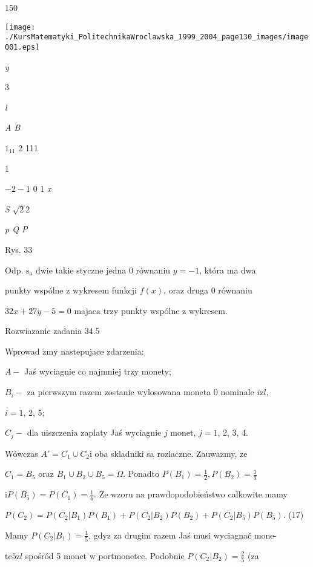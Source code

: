 \documentclass[a4paper,12pt]{article}
\begin{document}
150
\begin{center}
\texttt{[image: ./KursMatematyki\_PolitechnikaWroclawska\_1999\_2004\_page130\_images/image001.eps]}
\end{center}
{\it y}

3

{\it l}

{\it A  B}

$1_{11}$  2  111

1

$-2  -1$  0 1  {\it x}

{\it S}  $\sqrt{2}2$

{\it p  Q  P}

Rys. 33

Odp. $\mathrm{s}_{\mathrm{a}}$ dwie takie styczne jedna $0$ równaniu $y= -1$, która ma dwa

punkty wspólne $\mathrm{z}$ wykresem funkcji $f(x)$, oraz druga $0$ równaniu

$32x+27y-5=0$ majaca trzy punkty wspólne $\mathrm{z}$ wykresem.

Rozwiazanie zadania 34.5

Wprowad $\acute{\mathrm{z}}\mathrm{m}\mathrm{y}$ nastepujace zdarzenia:

$A-$ Jaś wyciagnie co najmniej trzy monety;

$B_{i}-$ za pierwszym razem zostanie wylosowana moneta $0$ nominale $i \mathrm{z}l,$

$i=1$, 2, 5;

$C_{j}-$ dla uiszczenia zaplaty Jaś wyciagnie $j$ monet, $j=1$, 2, 3, 4.

Wówczas $A' = C_{1}\cup C_{2} \mathrm{i}$ oba skladniki sa rozlaczne. Zauwazmy, $\dot{\mathrm{z}}\mathrm{e}$

$C_{1} = B_{5}$ oraz $B_{1}\cup B_{2}\cup B_{5} = \Omega$. Ponadto $P(B_{1}) = \displaystyle \frac{1}{2}, P(B_{2}) = \displaystyle \frac{1}{3}$

$\displaystyle \mathrm{i}P(B_{5})=P(C_{1})=\frac{1}{6}$. Ze wzoru na prawdopodobieństwo calkowite mamy

$P(C_{2})=P(C_{2}|B_{1})P(B_{1})+P(C_{2}|B_{2})P(B_{2})+P(C_{2}|B_{5})P(B_{5})$.   (17)

Mamy $P(C_{2}|B_{1})=\displaystyle \frac{1}{5}$, gdyz za drugim razem Jaś musi wyciagnač mone-

$\mathrm{t}\mathrm{e} 5 \mathrm{z}l$ spośród 5 monet $\mathrm{w}$ portmonetce. Podobnie $P(C_{2}|B_{2}) = \displaystyle \frac{2}{5}$ (za
\end{document}
